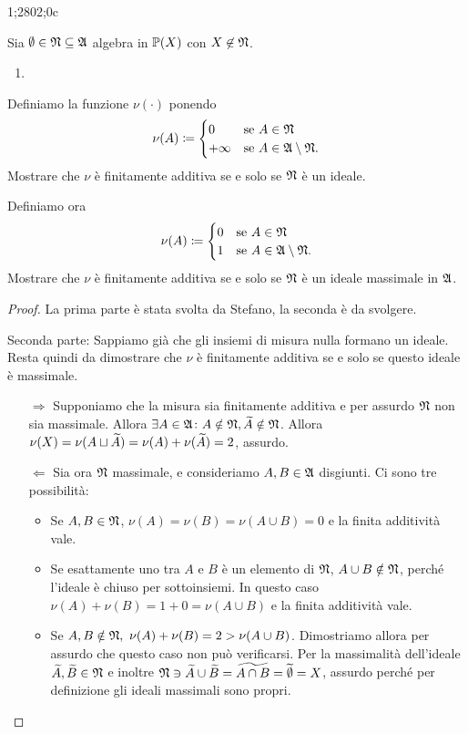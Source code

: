 1;2802;0c\documentclass[../EserciziIstituzioniAnalisi.tex]{subfiles}
\begin{document}
\begin{exercise}[13/10/2016]
  Sia $\emptyset \in \mathfrak N \subseteq \mathfrak A$ algebra in $\mathbb P(X)$ con $X \not\in \mathfrak N$.
  \begin{enumerate}
  \item 
  \end{enumerate}
  Definiamo la funzione $\nu(\cdot)$ ponendo 
  \begin{equation*}
    \nu(A) \coloneqq
    \begin{cases}
      0 & \text{se $A \in \mathfrak N$}\\
      +\infty & \text{se $A \in \mathfrak A\setminus \mathfrak N$}.
    \end{cases}
  \end{equation*}
  Mostrare che $\nu$ è finitamente additiva se e solo se $\mathfrak N$ è un ideale. 
\item Definiamo ora
  \begin{equation*}
    \nu(A) \coloneqq
    \begin{cases}
      0 & \text{se $A \in \mathfrak N$}\\
      1 & \text{se $A \in \mathfrak A\setminus \mathfrak N$}.
    \end{cases}
  \end{equation*}
  Mostrare che $\nu$ è finitamente additiva se e solo se $\mathfrak N$ è un ideale massimale in $\mathfrak A$.
\end{exercise}
\begin{proof}
  La prima parte è stata svolta da Stefano, la seconda è da svolgere.


  Seconda parte:
  Sappiamo già che gli insiemi di misura nulla formano un ideale. Resta quindi da dimostrare che $\nu$ è finitamente additiva se e solo se questo ideale è massimale.
  \begin{itemize}
    \item[$\Rightarrow$] Supponiamo che la misura sia finitamente additiva e per assurdo $\mathfrak N$ non sia massimale. Allora $\exists A\in\mathfrak A \colon A\notin \mathfrak N, \widetilde{A}\notin\mathfrak N$. Allora $\nu(X)=\nu(A\sqcup \widetilde{A})=\nu(A)+\nu (\widetilde{A})=2$, assurdo.
    \
    \item[$\Leftarrow$] Sia ora $\mathfrak N$ massimale, e consideriamo $A,B\in\mathfrak A$ disgiunti. Ci sono tre possibilità:
    \begin{itemize}
      \item Se $A,B\in\mathfrak N$, $\nu(A)=\nu(B)=\nu(A \cup B)=0$ e la finita additività vale.
      \item Se esattamente uno tra $A$ e $B$ è un elemento di $\mathfrak N$, $A\cup B \notin \mathfrak N$, perché l'ideale è chiuso per sottoinsiemi. In questo caso $\nu(A)+\nu(B)=1+0=\nu(A \cup B)$ e la finita additività vale.
      \item Se $A,B\notin\gN,\ \nu(A)+\nu(B)=2>\nu(A \cup B)$. Dimostriamo allora per assurdo che questo caso non può verificarsi. Per la massimalità dell'ideale $\widetilde{A},\widetilde{B}\in\mathfrak N$ e  inoltre $\mathfrak N \ni \widetilde{A} \cup \widetilde{B}=\widetilde{A\cap B}=\widetilde{\emptyset}=X$, assurdo perché per definizione gli ideali massimali sono propri.
    \end{itemize}
  \end{itemize}
\end{proof}
\end{document}
